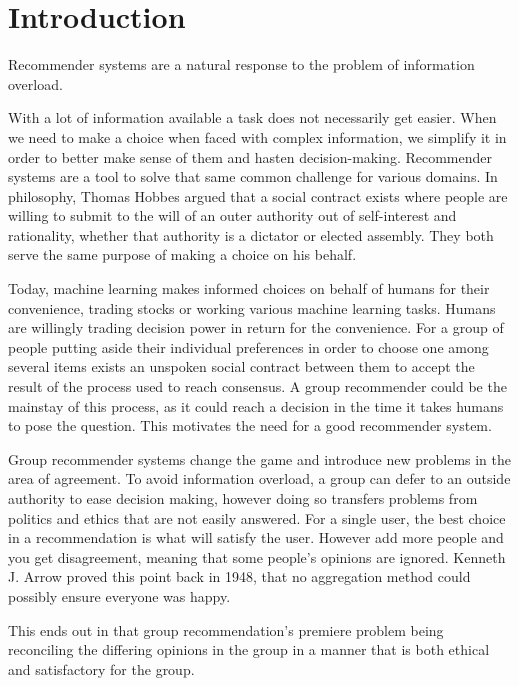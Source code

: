 \chapter{Introduction}
Recommender systems are a natural response to the problem of information overload.

With a lot of information available a task does not necessarily get easier. When we need to make a choice when faced with complex information, we simplify it in order to better make sense of them and hasten decision-making. Recommender systems are a tool to solve that same common challenge for various domains. In philosophy, Thomas Hobbes argued that a social contract exists where people are willing to submit to the will of an outer authority out of self-interest and rationality, whether that authority is a dictator or elected assembly. They both serve the same purpose of making a choice on his behalf.\cite{Hobbes}

Today, machine learning makes informed choices on behalf of humans for their convenience, trading stocks or working various machine learning tasks. Humans are willingly trading decision power in return for the convenience. For a group of people putting aside their individual preferences in order to choose one among several items exists an unspoken social contract between them to accept the result of the process used to reach consensus. A group recommender could be the mainstay of this process, as it could reach a decision in the time it takes humans to pose the question. This motivates the need for a good recommender system.

Group recommender systems change the game and introduce new problems in the area of agreement. To avoid information overload, a group can defer to an outside authority to ease decision making, however doing so transfers problems from politics and ethics that are not easily answered. For a single user, the best choice in a recommendation is what will satisfy the user. However add more people and you get disagreement, meaning that some people's opinions are ignored. Kenneth J. Arrow proved this point back in 1948, that no aggregation method could possibly ensure everyone was happy.\cite{arrow}

This ends out in that group recommendation's premiere problem being reconciling the differing opinions in the group in a manner that is both ethical and satisfactory for the group.


